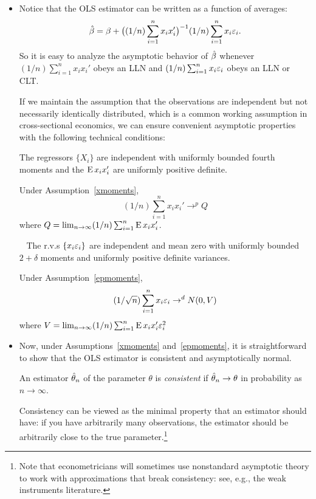\begin{itemize}
\item Notice that the OLS estimator can be written as a function of
  averages:
  \begin{equation*}
    \hat{\beta} = \beta + \big( (1/n) \sum_{i=1}^n x_i x_i' \big)^{-1}
    (1/n) \sum_{i=1}^n x_i \varepsilon_i.
  \end{equation*}
  So it is easy to analyze the asymptotic behavior of $\hat{\beta}$ whenever
  $(1/n) \sum_{i=1}^n x_i x_i'$ obeys an LLN and $(1/n) \sum_{i=1}^n x_i \varepsilon_i$
  obeys an LLN or CLT.

  If we maintain the assumption that the observations are independent
  but not necessarily identically distributed, which is a common
  working assumption in cross-sectional economics, we can ensure
  convenient asymptotic properties with the following technical
  conditions:
  \begin{asmp}\label{xmoments}
    The regressors $\{X_i\}$ are independent with uniformly bounded
    fourth moments and the $\operatorname{E} x_i x_i'$ are uniformly positive
    definite.
  \end{asmp}
  Under Assumption~\ref{xmoments},
  \begin{equation*}
    (1/n) \sum_{i=1}^n x_i x_i' \to^p Q
  \end{equation*}
  where $Q = \lim_{n\to\infty} (1/n) \sum_{i=1}^n \operatorname{E} x_i x_i'$.

  \begin{asmp}~\label{epmoments}
    The r.v.s $\{x_i \varepsilon_i\}$ are independent and mean zero with
    uniformly bounded $2 + \delta$ moments and uniformly positive definite
    variances.
  \end{asmp}
  Under Assumption~\ref{epmoments},
  \begin{equation*}
    (1/\sqrt{n}) \sum_{i=1}^n x_i \varepsilon_i \to^d N(0, V)
  \end{equation*}
  where $V = \lim_{n\to\infty} (1/n) \sum_{i=1}^n \operatorname{E} x_i x_i' \varepsilon_i^2$

\item Now, under Assumptions~\ref{xmoments} and~\ref{epmoments}, it is
  straightforward to show that the OLS estimator is consistent and
  asymptotically normal.
  \begin{defn}
    An estimator $\hat{\theta}_n$ of the parameter $\theta$ is \emph{consistent} if
    $\hat{\theta}_n \to \theta$ in probability as $n \to \infty$.
  \end{defn}
  Consistency can be viewed as the minimal property that an estimator
  should have: if you have arbitrarily many observations, the
  estimator should be arbitrarily close to the true
  parameter.\footnote{Note that econometricians will sometimes use
    nonstandard asymptotic theory to work with approximations that
    break consistency: see, e.g., the weak instruments literature.}


\end{itemize}
